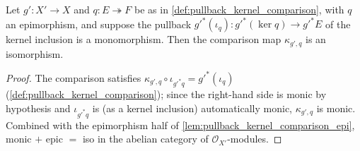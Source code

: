 \begin{lemma}\leanok
  \label{lem:pullback_kernel_comparison_iso_of_mono}
  Let \(g' : X' \to X\) and \(q : E \twoheadrightarrow F\) be as in
  \cref{def:pullback_kernel_comparison}, with \(q\) an epimorphism, and
  suppose the pullback \(g'^{*}(\iota_q) : g'^{*}(\ker q) \to g'^{*}E\) of
  the kernel inclusion is a monomorphism. Then the comparison map
  \(\kappa_{g',q}\) is an isomorphism.
\end{lemma}
\begin{proof}\leanok
  The comparison satisfies \(\kappa_{g',q} \circ \iota_{g'^{*}q} =
  g'^{*}(\iota_q)\) (\cref{def:pullback_kernel_comparison}); since the
  right-hand side is monic by hypothesis and \(\iota_{g'^{*}q}\) is (as a
  kernel inclusion) automatically monic, \(\kappa_{g',q}\) is monic.
  Combined with the epimorphism half of
  \cref{lem:pullback_kernel_comparison_epi}, monic \(+\) epic \(=\) iso in
  the abelian category of \(\mathcal O_{X'}\)-modules.
\end{proof}

